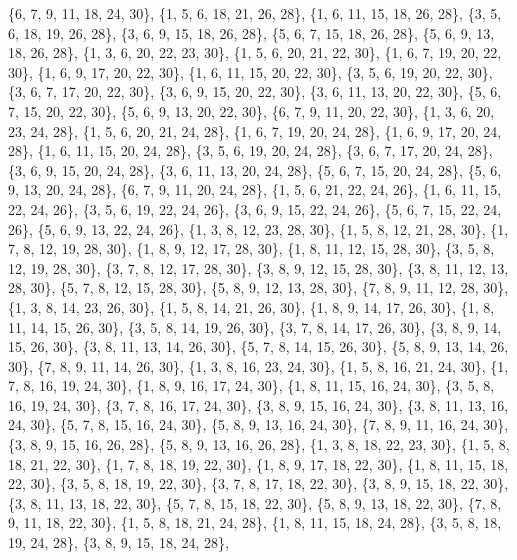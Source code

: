 \documentclass[11pt,a4paper]{article}
\begin{document}
{\{6, 7, 9, 11, 18, 24, 30\}, \{1, 5, 6, 18, 21, 26, 28\}, \{1, 6, 11, 15, 18, 26, 28\}, \{3, 5, 6, 18, 19, 26, 28\}, \{3, 6, 9, 15, 18, 26, 28\},
\{5, 6, 7, 15, 18, 26, 28\}, \{5, 6, 9, 13, 18, 26, 28\}, \{1, 3, 6, 20, 22, 23, 30\}, \{1, 5, 6, 20, 21, 22, 30\}, \{1, 6, 7, 19, 20, 22, 30\},
\{1, 6, 9, 17, 20, 22, 30\}, \{1, 6, 11, 15, 20, 22, 30\}, \{3, 5, 6, 19, 20, 22, 30\}, \{3, 6, 7, 17, 20, 22, 30\}, \{3, 6, 9, 15, 20, 22, 30\},
\{3, 6, 11, 13, 20, 22, 30\}, \{5, 6, 7, 15, 20, 22, 30\}, \{5, 6, 9, 13, 20, 22, 30\}, \{6, 7, 9, 11, 20, 22, 30\}, \{1, 3, 6, 20, 23, 24, 28\},
\{1, 5, 6, 20, 21, 24, 28\}, \{1, 6, 7, 19, 20, 24, 28\}, \{1, 6, 9, 17, 20, 24, 28\}, \{1, 6, 11, 15, 20, 24, 28\}, \{3, 5, 6, 19, 20, 24, 28\},
\{3, 6, 7, 17, 20, 24, 28\}, \{3, 6, 9, 15, 20, 24, 28\}, \{3, 6, 11, 13, 20, 24, 28\}, \{5, 6, 7, 15, 20, 24, 28\}, \{5, 6, 9, 13, 20, 24, 28\},
\{6, 7, 9, 11, 20, 24, 28\}, \{1, 5, 6, 21, 22, 24, 26\}, \{1, 6, 11, 15, 22, 24, 26\}, \{3, 5, 6, 19, 22, 24, 26\}, \{3, 6, 9, 15, 22, 24, 26\},
\{5, 6, 7, 15, 22, 24, 26\}, \{5, 6, 9, 13, 22, 24, 26\}, \{1, 3, 8, 12, 23, 28, 30\}, \{1, 5, 8, 12, 21, 28, 30\}, \{1, 7, 8, 12, 19, 28, 30\},
\{1, 8, 9, 12, 17, 28, 30\}, \{1, 8, 11, 12, 15, 28, 30\}, \{3, 5, 8, 12, 19, 28, 30\}, \{3, 7, 8, 12, 17, 28, 30\}, \{3, 8, 9, 12, 15, 28, 30\},
\{3, 8, 11, 12, 13, 28, 30\}, \{5, 7, 8, 12, 15, 28, 30\}, \{5, 8, 9, 12, 13, 28, 30\}, \{7, 8, 9, 11, 12, 28, 30\}, \{1, 3, 8, 14, 23, 26, 30\},
\{1, 5, 8, 14, 21, 26, 30\}, \{1, 8, 9, 14, 17, 26, 30\}, \{1, 8, 11, 14, 15, 26, 30\}, \{3, 5, 8, 14, 19, 26, 30\}, \{3, 7, 8, 14, 17, 26, 30\},
\{3, 8, 9, 14, 15, 26, 30\}, \{3, 8, 11, 13, 14, 26, 30\}, \{5, 7, 8, 14, 15, 26, 30\}, \{5, 8, 9, 13, 14, 26, 30\}, \{7, 8, 9, 11, 14, 26, 30\},
\{1, 3, 8, 16, 23, 24, 30\}, \{1, 5, 8, 16, 21, 24, 30\}, \{1, 7, 8, 16, 19, 24, 30\}, \{1, 8, 9, 16, 17, 24, 30\}, \{1, 8, 11, 15, 16, 24, 30\},
\{3, 5, 8, 16, 19, 24, 30\}, \{3, 7, 8, 16, 17, 24, 30\}, \{3, 8, 9, 15, 16, 24, 30\}, \{3, 8, 11, 13, 16, 24, 30\}, \{5, 7, 8, 15, 16, 24, 30\},
\{5, 8, 9, 13, 16, 24, 30\}, \{7, 8, 9, 11, 16, 24, 30\}, \{3, 8, 9, 15, 16, 26, 28\}, \{5, 8, 9, 13, 16, 26, 28\}, \{1, 3, 8, 18, 22, 23, 30\},
\{1, 5, 8, 18, 21, 22, 30\}, \{1, 7, 8, 18, 19, 22, 30\}, \{1, 8, 9, 17, 18, 22, 30\}, \{1, 8, 11, 15, 18, 22, 30\}, \{3, 5, 8, 18, 19, 22, 30\},
\{3, 7, 8, 17, 18, 22, 30\}, \{3, 8, 9, 15, 18, 22, 30\}, \{3, 8, 11, 13, 18, 22, 30\}, \{5, 7, 8, 15, 18, 22, 30\}, \{5, 8, 9, 13, 18, 22, 30\},
\{7, 8, 9, 11, 18, 22, 30\}, \{1, 5, 8, 18, 21, 24, 28\}, \{1, 8, 11, 15, 18, 24, 28\}, \{3, 5, 8, 18, 19, 24, 28\}, \{3, 8, 9, 15, 18, 24, 28\},
}
\end{document}
